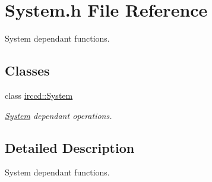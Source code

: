 \hypertarget{a00145}{\section{System.\-h File Reference}
\label{a00145}
}


System dependant functions.  


\subsection*{Classes}
\begin{DoxyCompactItemize}
\item 
class \hyperlink{a00067}{irccd\-::\-System}
\begin{DoxyCompactList}\small\item\em \hyperlink{a00067}{System} dependant operations. \end{DoxyCompactList}\end{DoxyCompactItemize}


\subsection{Detailed Description}
System dependant functions. 